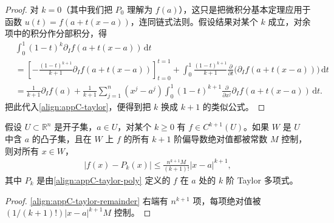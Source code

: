 \documentclass[../../main.tex]{subfiles}
\begin{document}
\begin{proof}
对 $k=0$（其中我们把 $P_0$ 理解为 $f(a)$），这只是把微积分基本定理应用于函数 $u(t)=f(a+t(x-a))$，连同链式法则。假设结果对某个 $k$ 成立，对余项中的积分作分部积分，得
\begin{align*}
&\int_0^1(1-t)^k\partial_I f(a+t(x-a))\,\mathrm{d}t\\
&=\left[-\frac{(1-t)^{k+1}}{k+1}\partial_I f(a+t(x-a))\right]_{t=0}^{t=1}
+\int_0^1\frac{(1-t)^{k+1}}{k+1}\frac{\partial}{\partial t}\big(\partial_I f(a+t(x-a))\big)\,\mathrm{d}t\\
&=\frac{1}{k+1}\partial_I f(a)+\frac{1}{k+1}\sum_{j=1}^n(x^j-a^j)\int_0^1(1-t)^{k+1}\frac{\partial}{\partial x^j}\partial_I f(a+t(x-a))\,\mathrm{d}t.
\end{align*}
把此代入\eqref{align:appC-taylor}，便得到把 $k$ 换成 $k+1$ 的类似公式。
\end{proof}

\begin{corollary}\label{corollary:appC-taylor-remainder}
假设 $U\subset\mathbb R^n$ 是开子集，$a\in U$，对某个 $k\geqslant0$ 有 $f\in C^{k+1}(U)$。如果 $W$ 是 $U$ 中含 $a$ 的凸子集，且在 $W$ 上 $f$ 的所有 $k+1$ 阶偏导数绝对值都被常数 $M$ 控制，则对所有 $x\in W$，
\begin{align*}
|f(x)-P_k(x)|\leqslant\frac{n^{k+1}M}{(k+1)!}|x-a|^{k+1},
\end{align*}
其中 $P_k$ 是由\eqref{align:appC-taylor-poly} 定义的 $f$ 在 $a$ 处的 $k$ 阶 Taylor 多项式。
\end{corollary}

\begin{proof}
\eqref{align:appC-taylor-remainder} 右端有 $n^{k+1}$ 项，每项绝对值被 $(1/(k+1)!)|x-a|^{k+1}M$ 控制。
\end{proof}
\end{document}
